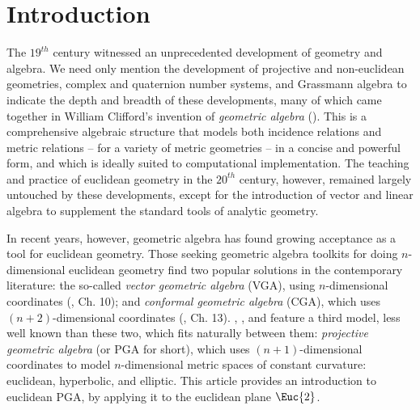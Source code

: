 \documentclass[12pt]{article}
\begin{document}
\section{Introduction}

The $19^{th}$ century witnessed an unprecedented development of geometry and algebra.  We need only mention the development of projective and non-euclidean geometries, complex and quaternion number systems, and Grassmann algebra to indicate the depth and breadth of these developments, many of which came together in William Clifford's invention of \emph{geometric algebra} (\cite{clifford78}).  This is a  comprehensive algebraic structure that models both incidence relations and metric relations -- for a variety of metric geometries -- in a concise and powerful form, and which is  ideally suited to computational implementation. The teaching and practice of euclidean  geometry in the $20^{th}$ century, however, remained largely untouched by these developments, except for the introduction of vector and linear algebra to supplement the standard tools of analytic geometry.    %

In recent years, however,  geometric algebra  has found growing acceptance as a tool for euclidean geometry. Those seeking geometric algebra toolkits for doing $n$-dimensional euclidean geometry  find two popular solutions in the contemporary literature:    the  so-called \emph{vector geometric algebra}  (VGA), using $n$-dimensional coordinates (\cite{dfm07}, Ch. 10); and  \emph{conformal geometric algebra} (CGA), which uses $(n+2)$-dimensional coordinates (\cite{dfm07}, Ch. 13). \cite{gunn2011}, \cite{gunnFull2010}, and \cite{gunn2016} feature a third model, less well known than these two, which fits naturally between them:  \emph{projective geometric algebra} (or PGA for short), which uses $(n+1)$-dimensional coordinates to model $n$-dimensional metric spaces of constant curvature: euclidean, hyperbolic, and elliptic.   This article provides an introduction to euclidean PGA, by applying it to the euclidean plane $\Euc{2}$. 
\end{document}
